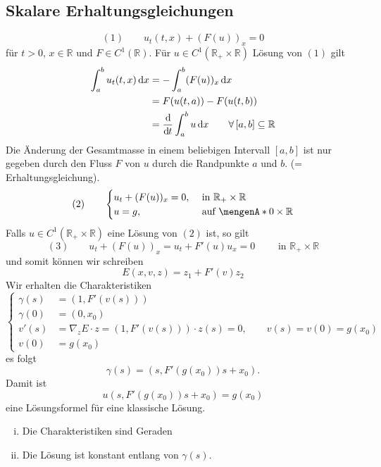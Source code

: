 \subsection{Skalare Erhaltungsgleichungen} 
\label{sub:skalare_erhaltungsgleichungen}
\[
	(1) \qquad u_t(t,x) + (F(u))_x = 0
\] für $t >0$, $x \in \mathbb{R}$ und $F \in C^1(\mathbb{R})$.
Für $u \in C^1(\mathbb{R}_+ \times \mathbb{R})$ Lösung von $(1)$ gilt 
\begin{align*}
	\int_{a}^{b} u_t(t,x) \,\mathrm{d}x &= - \int_{a}^{b} (F(u))_x \,\mathrm{d}x \\
	&= F(u(t,a))- F(u(t,b)) \\ &= \frac{\mathrm{d}\mkern-1.0mu }{\mathrm{d}\mkern-1.0mu t}  \int_{a}^{b} u  \,\mathrm{d}x \qquad \forall\, [a,b] \subseteq \mathbb{R}
\end{align*}
Die Änderung der Gesamtmasse in einem beliebigen Intervall $[a,b]$ ist nur gegeben durch den Fluss $F$ von $u$ durch die Randpunkte $a$ und $b$. (= Erhaltungsgleichung).
\[
	(2) \qquad \begin{cases}
		u_t + (F(u))_x = 0, &\text{ in }\mathbb{R}_+ \times \mathbb{R}\\
		u=g , &\text{ auf } \set{0} \times \mathbb{R}
	\end{cases}
\]
Falls $u \in C^1(\mathbb{R}_+ \times \mathbb{R})$ eine Lösung von $(2)$ ist, so gilt
\[
	(3) \qquad u_t + (F(u))_x = u_t +F'(u) u_x  = 0 \qquad \text{ in } \mathbb{R}_+ \times \mathbb{R}
\]
und somit können wir schreiben 
\[
	E(x,v,z) = z_1 + F'(v) z_2
\]
Wir erhalten die Charakteristiken
\[
	\begin{cases}
		\gamma(s) &= (1, F'(v(s)))\\
		\gamma(0) &= (0,x_0) \\
		v'(s) &=  \nabla _z E \cdot z = (1, F'(v(s))) \cdot z(s) = 0, \qquad v(s) = v(0) = g(x_0) \\
		v(0) &= g(x_0)
 	\end{cases}
\]
es folgt
\[
	\gamma(s) = (s, F'(g(x_0))s + x_0).
\]
Damit ist 
\[
	u(s,F'(g(x_0))s + x_0) = g(x_0) 
\]
eine Lösungsformel für eine klassische Lösung.
\begin{bemerkung}
	\begin{enumerate}[(i)]
		\item Die Charakteristiken sind Geraden
		\item Die Lösung ist konstant entlang von $\gamma(s)$.
	\end{enumerate}
\end{bemerkung}
